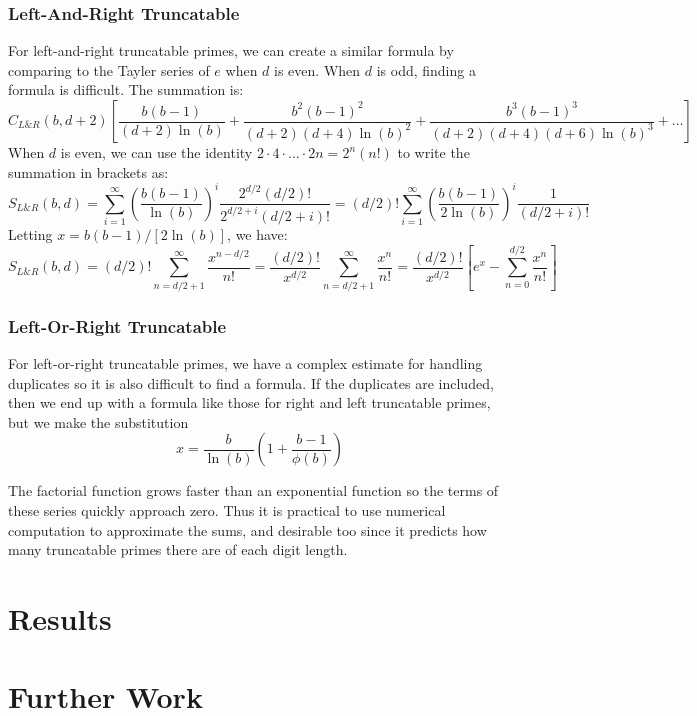 \documentclass[12pt]{article}
\begin{document}
\subsubsection{Left-And-Right Truncatable}

For left-and-right truncatable primes, we can create a similar formula by comparing to the Tayler series of $e$ when $d$ is even. When $d$ is odd, finding a formula is difficult. The summation is:
\begin{equation}
C_{L\&R}(b,d+2) \left[ \frac{b(b-1)}{(d+2)\ln(b)} + \frac{b^2(b-1)^2}{(d+2)(d+4)\ln(b)^2} + \frac{b^3(b-1)^3}{(d+2)(d+4)(d+6)\ln(b)^3} + \ldots \right]
\end{equation}
When $d$ is even, we can use the identity $2\cdot4\cdot\ldots\cdot2n=2^n(n!)$ to write the summation in brackets as:
\begin{equation}
S_{L\&R}(b,d) = \sum_{i=1}^\infty \left( \frac{b(b-1)}{\ln(b)} \right)^i \frac{2^{d/2}(d/2)!}{2^{d/2+i}(d/2+i)!} = (d/2)! \sum_{i=1}^\infty \left( \frac{b(b-1)}{2\ln(b)} \right)^i \frac{1}{(d/2+i)!}
\end{equation}
Letting $x=b(b-1)/[2\ln(b)]$, we have:
\begin{equation}
S_{L\&R}(b,d) = (d/2)! \sum_{n=d/2+1}^\infty \frac{x^{n-d/2}}{n!} = \frac{(d/2)!}{x^{d/2}} \sum_{n=d/2+1}^\infty \frac{x^n}{n!} = \frac{(d/2)!}{x^{d/2}} \left[ e^x - \sum_{n=0}^{d/2} \frac{x^n}{n!} \right]
\end{equation}

\subsubsection{Left-Or-Right Truncatable}

For left-or-right truncatable primes, we have a complex estimate for handling duplicates so it is also difficult to find a formula. If the duplicates are included, then we end up with a formula like those for right and left truncatable primes, but we make the substitution
\begin{equation}
x = \frac{b}{\ln(b)} \left( 1+\frac{b-1}{\phi(b)} \right)
\end{equation}

The factorial function grows faster than an exponential function so the terms of these series quickly approach zero. Thus it is practical to use numerical computation to approximate the sums, and desirable too since it predicts how many truncatable primes there are of each digit length.

\section{Results}

\section{Further Work}

\cite{PARI2} \cite{OEIS}

\printbibliography[title={References}]
\end{document}
